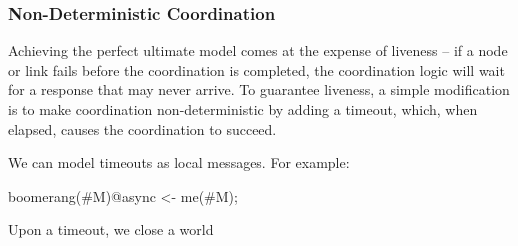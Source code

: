 \subsubsection{Non-Deterministic Coordination}

Achieving the perfect ultimate model comes at the expense of liveness -- if a node or link fails before the coordination is completed, the coordination logic will wait for a response that may never arrive.  To guarantee liveness, a simple modification is to make coordination non-deterministic by adding a timeout, which, when elapsed, causes the coordination to succeed.

We can model timeouts as local messages.  For example:

\begin{Dedalus}
boomerang(#M)@async <- me(#M);
\end{Dedalus}

Upon a timeout, we close a world 
